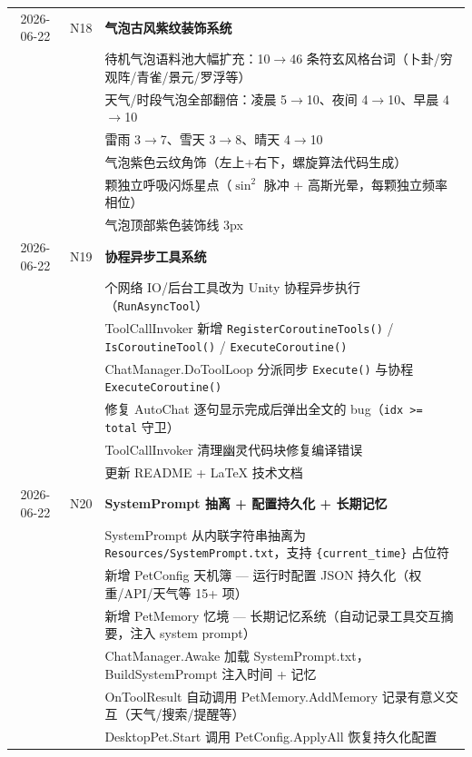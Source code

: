 \documentclass[12pt,a4paper]{ctexart}
\begin{document}
\begin{table}[H]
\begin{tabular}{cl>{\raggedright\arraybackslash}p{}}
2026-06-22 & N18  & \textbf{气泡古风紫纹装饰系统}\\
           &       & 待机气泡语料池大幅扩充：10$\to$46 条符玄风格台词（卜卦/穷观阵/青雀/景元/罗浮等）\\
           &       & 天气/时段气泡全部翻倍：凌晨 5$\to$10、夜间 4$\to$10、早晨 4$\to$10\\
           &       & 雷雨 3$\to$7、雪天 3$\to$8、晴天 4$\to$10\\
           &       & 气泡紫色云纹角饰（左上+右下，螺旋算法代码生成）\\
           &       & 12 颗独立呼吸闪烁星点（$\sin^2$ 脉冲 + 高斯光晕，每颗独立频率相位）\\
           &       & 气泡顶部紫色装饰线 3px\\
2026-06-22 & N19  & \textbf{协程异步工具系统}\\
           &       & 5 个网络 IO/后台工具改为 Unity 协程异步执行（\texttt{RunAsyncTool}）\\
           &       & ToolCallInvoker 新增 \texttt{RegisterCoroutineTools()} / \texttt{IsCoroutineTool()} / \texttt{ExecuteCoroutine()}\\
           &       & ChatManager.DoToolLoop 分派同步 \texttt{Execute()} 与协程 \texttt{ExecuteCoroutine()}\\
           &       & 修复 AutoChat 逐句显示完成后弹出全文的 bug（\texttt{idx >= total} 守卫）\\
           &       & ToolCallInvoker 清理幽灵代码块修复编译错误\\
           &       & 更新 README + LaTeX 技术文档\\
2026-06-22 & N20  & \textbf{SystemPrompt 抽离 + 配置持久化 + 长期记忆}\\
           &       & SystemPrompt 从内联字符串抽离为 \texttt{Resources/SystemPrompt.txt}，支持 \texttt{\{current\_time\}} 占位符\\
           &       & 新增 PetConfig 天机簿 — 运行时配置 JSON 持久化（权重/API/天气等 15+ 项）\\
           &       & 新增 PetMemory 忆境 — 长期记忆系统（自动记录工具交互摘要，注入 system prompt）\\
           &       & ChatManager.Awake 加载 SystemPrompt.txt，BuildSystemPrompt 注入时间 + 记忆\\
           &       & OnToolResult 自动调用 PetMemory.AddMemory 记录有意义交互（天气/搜索/提醒等）\\
           &       & DesktopPet.Start 调用 PetConfig.ApplyAll 恢复持久化配置\\

\end{tabular}
\end{table}
\end{document}
